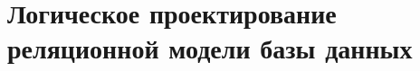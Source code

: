 \documentclass{report}
\begin{document}
\chapter{Логическое проектирование реляционной модели базы данных}
\end{document}

